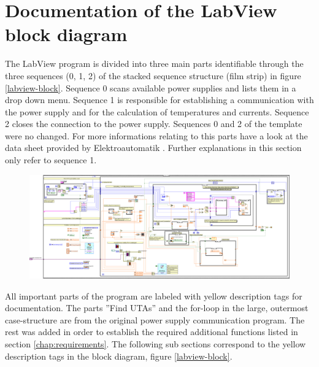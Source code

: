 \documentclass[parskip,12pt,headsepline,a4paper] {scrbook}
\begin{document}
\section{Documentation of the LabView block diagram}
\vspace{-0.5\baselineskip}
The LabView program is divided into three main parts identifiable through the three sequences (0, 1, 2) of the stacked sequence structure (film strip) in figure \ref{labview-block}. Sequence 0 scans available power supplies and lists them in a drop down menu. Sequence 1 is responsible for establishing a communication with the power supply and for the calculation of temperatures and currents. Sequence 2 closes the connection to the power supply. Sequences 0 and 2 of the template were no changed. For more informations relating to this parts have a look at the data sheet provided by Elektroautomatik \cite{ref-ps}. Further explanations in this section only refer to sequence 1.

\begin{figure}[ht]
\centerline{
\includegraphics[width=16cm]{./labview/overview.jpg}}
\end{figure}

All important parts of the program are labeled with yellow description tags for documentation. The parts ''Find UTAs'' and the for-loop in the large, outermost case-structure are from the original power supply communication program. The rest was added in order to establish the required additional functions listed in section \ref{chap:requirements}. The following sub sections correspond to the yellow description tags in the block diagram, figure \ref{labview-block}.
\end{document}
